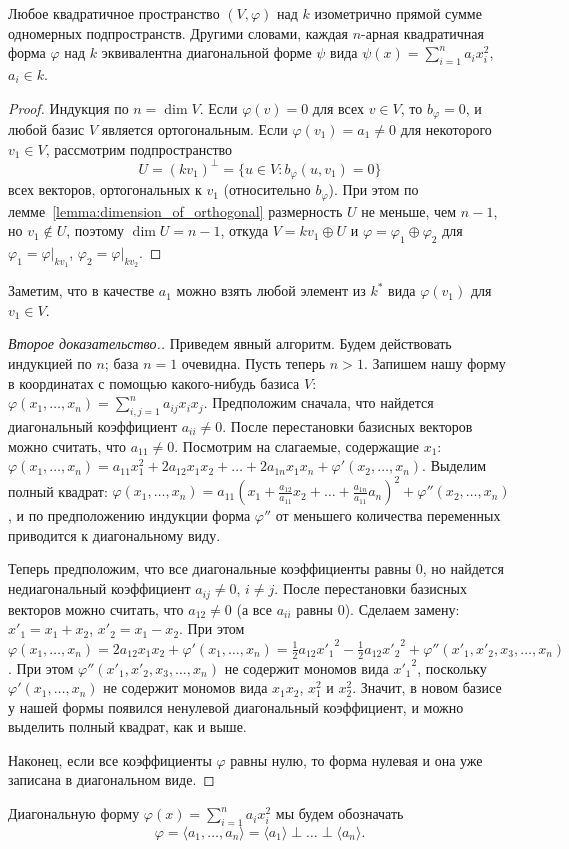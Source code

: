 \documentclass[a4paper,oneside,12pt]{article}
\theoremstyle{plain} { \swapnumbers
\newtheorem{theorem}{Теорема}[subsection]
\newtheorem{corollary}[theorem]{Следствие}
\newtheorem{lemma}[theorem]{Лемма}
\newtheorem{proposition}[theorem]{Утверждение}
\newtheorem{claim}[theorem]{Факт}
}
\theoremstyle{definition} { \swapnumbers
\newtheorem{definition}[theorem]{Определение}
\newtheorem{notation}[theorem]{Обозначение}
\newtheorem{remark}[theorem]{Замечание}
\newtheorem{remarks}[theorem]{Замечания}
\newtheorem{example}[theorem]{Пример}
\newtheorem{examples}[theorem]{Примеры}
\newtheorem{sssection}[theorem]{}
}
\def\ph{\varphi}
\def\la{\langle}
\def\ra{\rangle}
\begin{document}
\begin{theorem}\label{thm:diagonalisation}
Любое квадратичное пространство $(V,\ph)$ над $k$ изометрично прямой сумме одномерных подпространств.
Другими словами, каждая $n$-арная квадратичная форма $\ph$ над $k$ эквивалентна диагональной форме
$\psi$ вида $\psi(x)=\sum_{i=1}^n{a_ix_i^2}$, $a_i\in k$.
\end{theorem}
\begin{proof}
Индукция по $n=\dim V$. Если $\ph(v)=0$ для всех $v\in V$, то $b_\ph=0$, и любой базис $V$ является
ортогональным.
Если $\ph(v_1)=a_1\neq 0$ для некоторого $v_1\in V$, рассмотрим подпространство
$$
U=(kv_1)^\perp=\{u\in V:b_\ph(u,v_1)=0\}
$$
всех векторов, ортогональных к $v_1$ (относительно $b_\ph$). При этом
по лемме~\ref{lemma:dimension_of_orthogonal} размерность $U$ не меньше,
чем $n-1$, но $v_1\notin U$,
поэтому $\dim U=n-1$, откуда $V=kv_1\oplus U$ и $\ph=\ph_1\oplus\ph_2$ для
$\ph_1=\ph|_{kv_1}$, $\ph_2=\ph|_{kv_2}$.
\end{proof}
Заметим, что в качестве $a_1$ можно взять любой элемент из $k^*$ вида $\ph(v_1)$ для $v_1\in V$.
\begin{proof}[{Второе доказательство.}] Приведем явный алгоритм. Будем действовать
индукцией по $n$; база $n=1$ очевидна. Пусть теперь $n>1$. Запишем нашу
форму в координатах с помощью какого-нибудь базиса $V$:
$\ph(x_1,\dots,x_n)=\sum_{i,j=1}^na_{ij}x_ix_j$. Предположим сначала,
что найдется диагональный коэффициент $a_{ii}\neq 0$. После перестановки базисных
векторов можно считать, что $a_{11}\neq 0$.
Посмотрим на слагаемые, содержащие $x_1$:
$\ph(x_1,\dots,x_n)=a_{11}x_1^2+2a_{12}x_1x_2+\dots+2a_{1n}x_1x_n+\ph'(x_2,\dots,x_n)$.
Выделим полный квадрат: $\ph(x_1,\dots,x_n)=a_{11}(x_1+\frac{a_{12}}{a_{11}}x_2+\dots
+\frac{a_{1n}}{a_{11}}a_n)^2+\ph''(x_2,\dots,x_n)$, и по предположению индукции
форма $\ph''$ от меньшего количества переменных приводится к диагональному виду.

Теперь предположим, что все диагональные коэффициенты равны 0, но найдется
недиагональный коэффициент $a_{ij}\neq 0$, $i\neq j$. После перестановки базисных
векторов можно считать, что $a_{12}\neq 0$ (а все $a_{ii}$ равны 0).
Сделаем замену: $x'_1=x_1+x_2$, $x'_2=x_1-x_2$. При этом
$\ph(x_1,\dots,x_n)=2a_{12}x_1x_2+\ph'(x_1,\dots,x_n)=\frac{1}{2}a_{12}{x'_1}^2-
\frac{1}{2}a_{12}{x'_2}^2+\ph''(x'_1,x'_2,x_3,\dots,x_n)$.
При этом $\ph''(x'_1,x'_2,x_3,\dots,x_n)$ не содержит мономов вида ${x'_1}^2$,
поскольку $\ph'(x_1,\dots,x_n)$ не содержит мономов вида $x_1x_2$, $x_1^2$ и $x_2^2$.
Значит, в новом базисе у нашей формы появился ненулевой диагональный коэффициент,
и можно выделить полный квадрат, как и выше.

Наконец, если все коэффициенты $\ph$ равны нулю, то форма нулевая и она уже
записана в диагональном виде.
\end{proof}
Диагональную форму $\ph(x)=\sum_{i=1}^n{a_ix_i^2}$ мы будем обозначать
$$
\ph=\la a_1,\dots,a_n\ra=\la a_1\ra\perp\dots\perp\la a_n\ra.
$$
\end{document}

